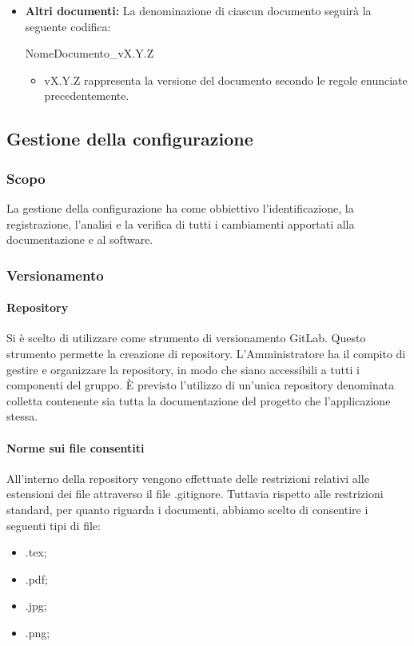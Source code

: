 \documentclass[11pt,a4paper]{article}
\begin{document}
{\begin{itemize}
		\begin{itemize}
			\item X rappresenta la data del verbale.
		\end{itemize}
		
		\item \textbf{Altri documenti:} La denominazione di ciascun documento seguirà la seguente codifica:
		\begin{center}
			NomeDocumento\_vX.Y.Z
		\end{center}
		
		\begin{itemize}
			\item vX.Y.Z rappresenta la versione del documento secondo le regole enunciate precedentemente.
		\end{itemize}
		
	\end{itemize}
	
	\newpage

\subsection{Gestione della configurazione}
\subsubsection{Scopo}
La gestione della configurazione ha come obbiettivo l'identificazione, la registrazione, l'analisi e la verifica di tutti i cambiamenti apportati alla documentazione e al software.
\subsubsection{Versionamento}
\paragraph{Repository}
Si è scelto di utilizzare come strumento di versionamento GitLab. Questo strumento permette la creazione di repository.
L'Amministratore ha il compito di gestire e organizzare la repository, in modo che siano accessibili a tutti i componenti del gruppo.
È previsto l'utilizzo di un'unica repository denominata colletta contenente sia tutta la documentazione del progetto che l'applicazione stessa.
\paragraph{Norme sui file consentiti}
All'interno della repository vengono effettuate delle restrizioni relativi alle estensioni dei file attraverso il file .gitignore.
Tuttavia rispetto alle restrizioni standard, per quanto riguarda i documenti, abbiamo scelto di consentire i seguenti tipi di file: 
\begin{itemize}
	\item .tex;
	\item .pdf;
	\item .jpg;
	\item .png;
\end{itemize}

}
\end{document}
